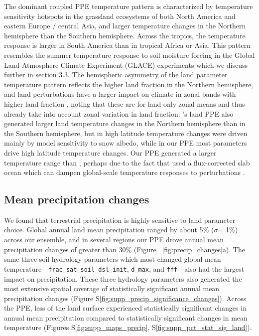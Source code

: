 \documentclass[draft]{agujournal2019}
\begin{document}
The dominant coupled PPE temperature pattern is characterized by temperature sensitivity hotspots in the grassland ecosystems of both North America and eastern Europe / central Asia, and larger temperature changes in the Northern hemisphere than the Southern hemisphere. Across the tropics, the temperature response is larger in South America than in tropical Africa or Asia. This pattern resembles the summer temperature response to soil moisture forcing in the Global Land-Atmosphere Climate Experiment (GLACE) experiments \citep{koster_glace_2006, seneviratne_impact_2013} which we discuss further in section 3.3. The hemispheric asymmetry of the land parameter temperature pattern reflects the higher land fraction in the Northern hemisphere, and land perturbations have a larger impact on climate in zonal bands with higher land fraction \citep{lague_terrestrial_2021}, noting that these are for land-only zonal means and thus already take into account zonal variation in land fraction. \cite{fischer_quantifying_2011}’s land PPE also generated larger land temperature changes in the Northern hemisphere than in the Southern hemisphere, but in \citeauthor{fischer_quantifying_2011} high latitude temperature changes were driven mainly by model sensitivity to snow albedo, while in our PPE most parameters drive high latitude temperature changes. Our PPE generated a larger temperature range than \citeauthor{fischer_quantifying_2011}, perhaps due to the fact that \citeauthor{fischer_quantifying_2011} used a flux-corrected slab ocean which can dampen global-scale temperature responses to perturbations \citep{yamazaki_perturbed_2021}.

\subsection{Mean precipitation changes}
We found that terrestrial precipitation is highly sensitive to land parameter choice. Global annual land mean precipitation ranged by about 5$\%$ ($\sigma$= 1$\%$) across our ensemble, and in several regions our PPE drove annual mean precipitation changes of greater than 30$\%$ (Figure ~\ref{fig:precip_changes}a). The same three soil hydrology parameters which most changed global mean temperature—\texttt{frac_sat_soil_dsl_init}, \texttt{d_max}, and \texttt{fff}—also had the largest impact on precipitation. These three hydrology parameters also generated the most extensive spatial coverage of statistically significant annual mean precipitation changes (Figure S\ref{fig:supp_precip_significance_changes}). Across the PPE, less of the land surface experienced statistically significant changes in annual mean precipitation compared to statistically significant changes in mean temperature (Figures S\ref{fig:supp_maps_precip}, S\ref{fig:supp_pct_stat_sig_land}).
\end{document}
